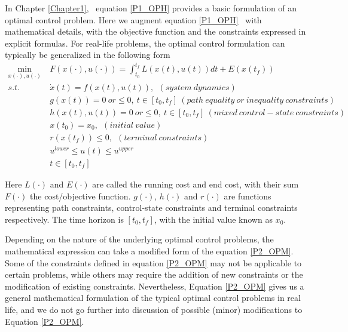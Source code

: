\documentclass  [
  paper    = a4,
  BCOR     = 10mm,
  twoside,
  fontsize = 12pt,
  fleqn,
  toc      = bibnumbered,
  toc      = listofnumbered,
  numbers  = noendperiod,
  headings = normal,
  listof   = leveldown,
  version  = 3.03
]                                       {scrreprt}
\newcommand{\<}{\langle}
\renewcommand{\>}{\rangle}
\begin{document}
In Chapter \ref{Chapter1},  equation \ref{P1_OPH} provides a basic formulation of an optimal control problem. Here we augment equation \ref{P1_OPH}  with mathematical details, with the objective function and the constraints expressed in explicit formulas. For real-life problems, the optimal control formulation can typically be generalized in the following form  
	\begin{subequations}
		\begin{align}
			\underset{x(\cdot), u(\cdot)}{\text{min}}   \ &  F(x(\cdot), u(\cdot))  = \int_{t_0}^{t_f}L(x(t), u(t))dt + E (x(t_f)) \label{P2_cost} \\
			s.t.\ \ &  \dot{x} (t) = f(x(t), u(t)), \ \ (system \ dynamics)   \label{P2_sd} \\
			& g(x(t)) = 0 \  or \leq 0, \ t \in [t_0, t_f]\  (path\  equality\ or\ inequality\ constraints)  \label{P2_ec}\\
			& h(x(t), u(t)) =0\  or  \leq 0,\ t \in [t_0, t_f] \ (mixed \ control-state  \ constraints)  \label{P2_inc}\\
			& x(t_0) = x_0, \ \ (initial \ value) \\
			& r(x(t_f)) \leq 0, \ \ (terminal \ constraints)  \label{P2_final} \\
			& u^{lower} \leq u(t) \leq u^{upper}   \label{P2_box_u} \\ 
			& t \in [t_0, t_f]
		\end{align}
		\label{P2_OPM}
	\end{subequations}  

Here $L(\cdot)$ and $E(\cdot)$ are called the running cost and end cost, with their sum $F(\cdot)$ the cost/objective function. $g(\cdot)$, $h(\cdot)$ and $r(\cdot)$ are functions representing path constraints, control-state constraints and terminal constraints respectively. The time horizon is $[t_0, t_f]$, with the initial value known as $x_0$.   

Depending on the nature of the underlying optimal control problems, the mathematical expression can take a modified form of the equation \ref{P2_OPM}. Some of the constraints defined in equation \ref{P2_OPM} may not be applicable to certain problems, while others may require the addition of new constraints or the modification of existing constraints. Nevertheless, Equation \ref{P2_OPM} gives us a general mathematical formulation of the typical optimal control problems in real life, and we do not go further into discussion of possible (minor) modifications to Equation \ref{P2_OPM}. 
\end{document}
